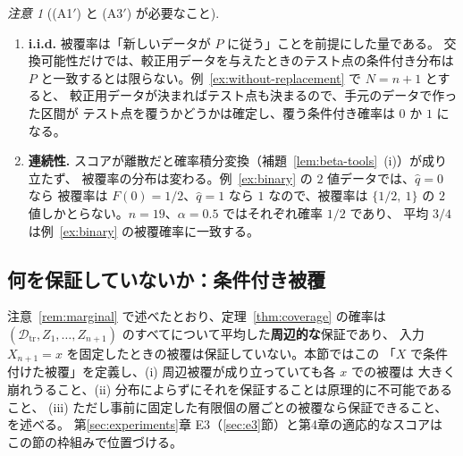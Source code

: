 \documentclass[a4paper,11pt]{jsarticle}
\theoremstyle{definition}
\theoremstyle{plain}
\theoremstyle{remark}
\newtheorem{remark}[definition]{注意}
\newcommand{\Dtr}{\mathcal{D}_{\mathrm{tr}}}     %
\newcommand{\qhat}{\hat{q}}
\begin{document}
\begin{remark}[(A1$'$) と (A3$'$) が必要なこと]
  \label{rem:cond-coverage-assumptions}
  \leavevmode  %
  \begin{enumerate}
    \item \textbf{i.i.d.}
      被覆率は「新しいデータが $P$ に従う」ことを前提にした量である。
      交換可能性だけでは、較正用データを与えたときのテスト点の条件付き分布は
      $P$ と一致するとは限らない。例~\ref{ex:without-replacement} で $N=n+1$ とすると、
      較正用データが決まればテスト点も決まるので、手元のデータで作った区間が
      テスト点を覆うかどうかは確定し、覆う条件付き確率は $0$ か $1$ になる。
    \item \textbf{連続性.}
      スコアが離散だと確率積分変換（補題~\ref{lem:beta-tools}~(i)）が成り立たず、
      被覆率の分布は変わる。例~\ref{ex:binary} の $2$ 値データでは、$\qhat=0$ なら
      被覆率は $F(0)=1/2$、$\qhat=1$ なら $1$ なので、被覆率は $\{1/2,\ 1\}$ の
      $2$ 値しかとらない。$n=19$、$\alpha=0.5$ ではそれぞれ確率 $1/2$ であり、
      平均 $3/4$ は例~\ref{ex:binary} の被覆確率に一致する。
  \end{enumerate}
\end{remark}

\subsection{何を保証していないか：条件付き被覆}
\label{sec:x-conditional}

注意~\ref{rem:marginal} で述べたとおり、定理~\ref{thm:coverage} の確率は
$(\Dtr,Z_1,\dots,Z_{n+1})$ のすべてについて平均した\textbf{周辺的な}保証であり、
入力 $X_{n+1}=x$ を固定したときの被覆は保証していない。本節ではこの
「$X$ で条件付けた被覆」を定義し、(i) 周辺被覆が成り立っていても各 $x$ での被覆は
大きく崩れうること、(ii) 分布によらずにそれを保証することは原理的に不可能であること、
(iii) ただし事前に固定した有限個の層ごとの被覆なら保証できること、を述べる。
第\ref{sec:experiments}章 E3（\ref{sec:e3}節）と第4章の適応的なスコアは
この節の枠組みで位置づける。
\end{document}

